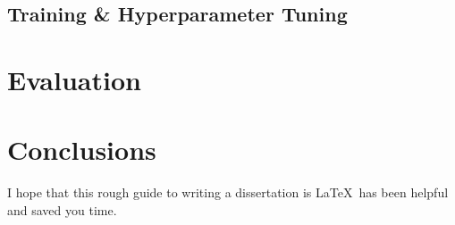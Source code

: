 \documentclass[12pt,a4paper,twoside,openright]{report}
\begin{document}
\section{Training \& Hyperparameter Tuning}
\chapter{Evaluation}


\chapter{Conclusions}

I hope that this rough guide to writing a dissertation is \LaTeX\ has
been helpful and saved you time.


\printbibliography[
heading=bibintoc,
title={Bibliography}
]

\appendix
\end{document}
